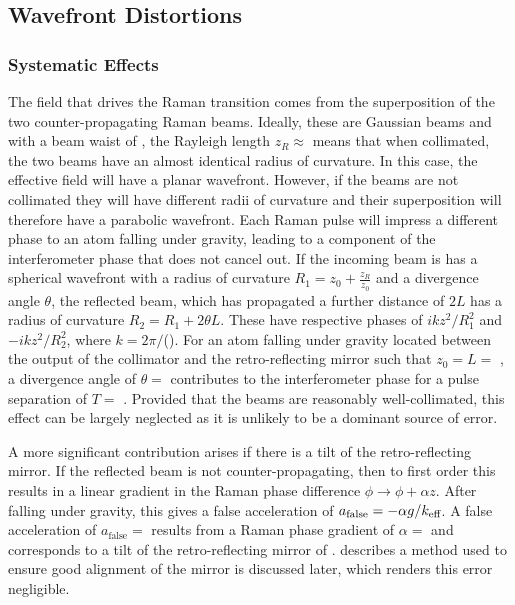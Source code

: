 \subsection{Wavefront Distortions}\label{subsec:fringe_wavefront}
\subsubsection{Systematic Effects}
The field that drives the Raman transition comes from the
superposition of the two counter-propagating Raman beams. Ideally,
these are Gaussian beams and with a beam
waist of , the Rayleigh length $z_R \approx
$  means that when collimated, the two beams have an
almost identical radius of curvature.  
In this case, the effective field will have a planar wavefront.
However, if the beams are not collimated they will have different
radii of curvature and their superposition will therefore
have a parabolic wavefront. Each Raman pulse will impress a different
phase to an atom falling under gravity, leading to a component of the
interferometer phase that does not cancel out. If the incoming beam is
has a spherical wavefront with a radius of curvature $R_1 = z_0 +
\frac{z_R}{z_0}$ and a divergence angle $\theta$, the
reflected beam, which has propagated a further distance of $2L$ has a
radius of curvature $R_2 = R_1 + 2\theta L$. These have respective
phases of $i k z^2/R_1^2$ and $-i k z^2/R_2^2$, where $k =
2\pi/$(). For an atom falling under
gravity located
between the output of the collimator and the retro-reflecting mirror
such that $z_0 = L =$ , a divergence angle of
$\theta =$  contributes
 to the
interferometer phase for a pulse separation of $T=$
. Provided that the beams are reasonably
well-collimated, this effect can be largely neglected as it is
unlikely to be a dominant source of error. 
\par\noindent
A more significant contribution 
arises if there is a tilt of the retro-reflecting
mirror. If the reflected beam is not counter-propagating,
then to first order this results in a linear gradient in the Raman
phase difference $\phi \rightarrow \phi + \alpha z$. After falling
under gravity, this gives a false acceleration of $a_\text{false} = -
\alpha g/k_\textnormal{eff}$. A false acceleration of $a_\text{false}
=$  results from a Raman phase gradient of
$\alpha = $  and corresponds to a tilt
of the retro-reflecting mirror of .
 describes a method
used to ensure good alignment of the mirror is discussed later, which
renders this error negligible.

